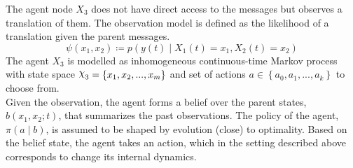 The agent node $ X_3 $ does not have direct access to the messages but observes a translation of them. The observation model is defined as the likelihood of a translation given the parent messages.
\begin{equation}
\psi(x_1, x_2) \coloneqq p(y(t) \mid X_{1}(t)=x_1, X_{2}(t)=x_2)
\end{equation}
The agent  $ X_{3} $ is modelled as inhomogeneous continuous-time Markov process with state space $ \rchi_{3} = \left\lbrace x_{1}, x_{2}, ..., x_{m} \right\rbrace  $ and set of actions $ a \in \left\lbrace a_{0}, a_{1}, ..., a_{k}\right\rbrace  $ to choose from. \\
Given the observation, the agent forms a belief over the parent states, $  b(x_{1}, x_{2}; t) $, that summarizes the past observations. The policy of the agent, $ \pi(a \mid b) $, is assumed to be shaped by evolution (close) to optimality. Based on the belief state, the agent takes an action, which in the setting described above corresponds to change its internal dynamics. 

